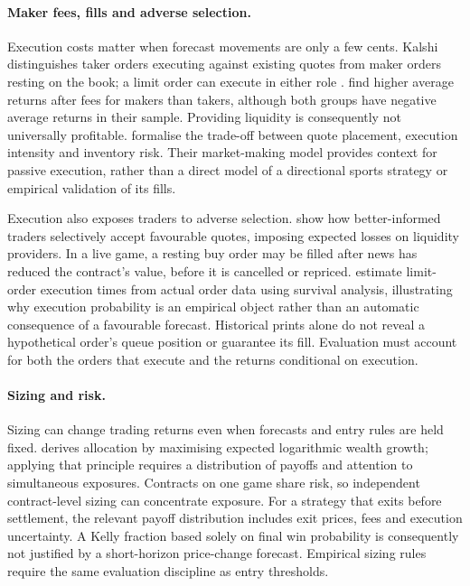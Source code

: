 \documentclass[12pt,a4paper,oneside]{report}
\begin{document}
\paragraph{Maker fees, fills and adverse selection.}
Execution costs matter when forecast movements are only a few cents. Kalshi
distinguishes taker orders executing against existing quotes from maker orders
resting on the book; a limit order can execute in either role
\citep{kalshi2026feeshelp}. \citet{burgi2025makers} find higher average returns
after fees for makers than takers, although both groups have negative average
returns in their sample. Providing liquidity is consequently not universally
profitable. \citet{avellaneda2008high} formalise the trade-off between quote
placement, execution intensity and inventory risk. Their market-making model
provides context for passive execution, rather than a direct model of a
directional sports strategy or empirical validation of its fills.

Execution also exposes traders to adverse selection. \citet{glosten1985bid}
show how better-informed traders selectively accept favourable quotes, imposing
expected losses on liquidity providers. In a live game, a resting buy order may
be filled after news has reduced the contract's value, before it is cancelled
or repriced. \citet{lo2002econometric} estimate limit-order execution times from
actual order data using survival analysis, illustrating why execution probability
is an empirical object rather than an automatic consequence of a favourable
forecast. Historical prints alone do not reveal a hypothetical order's queue
position or guarantee its fill. Evaluation must account for both the orders that
execute and the returns conditional on execution.

\paragraph{Sizing and risk.}
Sizing can change trading returns even when forecasts and entry rules are held
fixed. \citet{kelly1956new} derives allocation by maximising expected logarithmic
wealth growth; applying that principle requires a distribution of payoffs and
attention to simultaneous exposures. Contracts on one game share risk, so
independent contract-level sizing can concentrate exposure. For a strategy that
exits before settlement, the relevant payoff distribution includes exit prices,
fees and execution uncertainty. A Kelly fraction based solely on final win
probability is consequently not justified by a short-horizon price-change
forecast. Empirical sizing rules require the same evaluation discipline as
entry thresholds.
\end{document}
